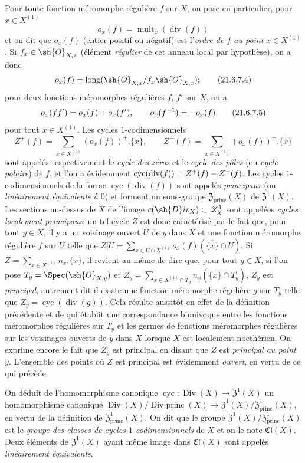 \begin{env}[21.6.7]
Pour toute fonction méromorphe régulière $f$ sur $X$, on pose en particulier, pour $x\in X^{(1)}$
\[
\label{IV.21.6.7.3}
  o_x(f)=\operatorname{mult}_x(\operatorname{div}(f))
  \tag{21.6.7.3}
\]
et on dit que $o_x(f)$ (entier positif ou négatif) est l'\emph{ordre de $f$ au point} $x\in X^{(1)}$.
Si $f_x\in\sh{O}_{X,x}$ (élément \emph{régulier} de cet anneau local par hypothèse), on a donc
\[
\label{IV.21.6.7.4}
  o_x(f)=\operatorname{long}(\sh{O}_{X,x}/f_x\sh{O}_{X,x});
  \tag{21.6.7.4}
\]
pour deux fonctions méromorphes régulières $f$, $f'$ sur $X$, on a
\[
\label{IV.21.6.7.5}
  o_x(ff')=o_x(f)+o_x(f'),\qquad o_x(f^{-1})=- o_x(f)
  \tag{21.6.7.5}
\]
pour tout $x\in X^{(1)}$.
Les cycles $1$-codimensionnels
\[
  Z^+(f)=\sum_{x\in X^{(1)}}(o_x(f))^+.\overline{\{x\}},\qquad
  Z^-(f)=\sum_{x\in X^{(1)}}(o_x(f))^-.\overline{\{x\}}
\]
sont appelés respectivement le \emph{cycle des zéros} et le \emph{cycle des pôles} (ou \emph{cycle polaire}) de $f$, et l'on a évidemment $\operatorname{cyc}(\operatorname{div}(f))=Z^+(f)- Z^-(f)$.
Les cycles $1$-codimensionnels de la forme $\operatorname{cyc}(\operatorname{div}(f))$ sont appelés \emph{principaux} (ou \emph{linéairement équivalents à} $0$) et forment un sous-groupe $\mathfrak{Z}^1_\mathrm{princ}(X)$ de $\mathfrak{Z}^1(X)$.
Les sections au-dessus de $X$ de l'image $c(\sh{D}iv_X)\subset\mathscr{Z}_X^1$ sont
appelées \emph{cycles localement principaux};
un tel cycle $Z$ est donc caractérisé par le fait que, pour tout $y\in X$, il y a un voisinage ouvert $U$ de $y$ dans $X$ et une fonction méromorphe régulière $f$ sur $U$ telle que $Z|U=\sum_{x\in U\cap X^{(1)}}o_x(f)(\overline{\{x\}}\cap U)$.
Si $Z=\sum_{x\in X^{(1)}}n_x.\overline{\{x\}}$, il revient au même de dire que, pour tout $y\in X$, si l'on pose $T_y=\Spec(\sh{O}_{X,y})$ et $Z_y=\sum_{x\in X^{(1)}\cap T_y}n_x(\overline{\{x\}}\cap T_y)$, $Z_y$ est \emph{principal}, autrement dit il existe une fonction méromorphe régulière $g$ sur $T_y$ telle que $Z_y=\operatorname{cyc}(\operatorname{div}(g))$.
Cela résulte aussitôt en effet de la définition précédente et de  qui établit une correspondance biunivoque entre les fonctions méromorphes régulières sur $T_y$ et les germes de fonctions méromorphes régulières sur les voisinages ouverts de $y$ dans $X$ lorsque $X$ est localement noethérien.
On exprime encore le fait que $Z_y$ est principal en disant que $Z$ est \emph{principal au point $y$}.
L'ensemble des points où $Z$ est principal est évidemment \emph{ouvert}, en vertu de ce qui précède.

On déduit de l'homomorphisme canonique $\operatorname{cyc}:\operatorname{Div}(X)\to\mathfrak{Z}^1(X)$ un homomorphisme canonique $\operatorname{Div}(X)/\operatorname{Div.princ}(X)\to\mathfrak{Z}^1(X)/\mathfrak{Z}^1_\mathrm{princ}(X)$, en vertu de la définition de $\mathfrak{Z}^1_\mathrm{princ}(X)$.
On dit que le groupe $\mathfrak{Z}^1(X)/\mathfrak{Z}^1_\mathrm{princ}(X)$ est le \emph{groupe des classes de cycles $1$-codimensionnels} de $X$ et on le note $\mathfrak{Cl}(X)$.
Deux éléments de $\mathfrak{Z}^1(X)$ ayant même image dans $\mathfrak{Cl}(X)$ sont appelés \emph{linéairement équivalents}.
\end{env}

